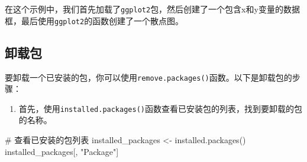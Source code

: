 \documentclass[
  letterpaper,
  DIV=11,
  numbers=noendperiod]{scrreprt}
\newenvironment{Shaded}{\begin{snugshade}}{\end{snugshade}}
\newcommand{\CommentTok}[1]{\textcolor[rgb]{0.37,0.37,0.37}{#1}}
\newcommand{\FunctionTok}[1]{\textcolor[rgb]{0.28,0.35,0.67}{#1}}
\newcommand{\NormalTok}[1]{\textcolor[rgb]{0.00,0.23,0.31}{#1}}
\newcommand{\OtherTok}[1]{\textcolor[rgb]{0.00,0.23,0.31}{#1}}
\newcommand{\StringTok}[1]{\textcolor[rgb]{0.13,0.47,0.30}{#1}}
\providecommand{\tightlist}{%
  \setlength{\itemsep}{0pt}\setlength{\parskip}{0pt}}\usepackage{longtable,booktabs,array}
\begin{document}
在这个示例中，我们首先加载了\texttt{ggplot2}包，然后创建了一个包含x和y变量的数据框，最后使用\texttt{ggplot2}的函数创建了一个散点图。

\hypertarget{ux5378ux8f7dux5305}{%
\subsection{卸载包}\label{ux5378ux8f7dux5305}}

要卸载一个已安装的包，你可以使用\texttt{remove.packages()}函数。以下是卸载包的步骤：

\begin{enumerate}
\def\labelenumi{\arabic{enumi}.}
\tightlist
\item
  首先，使用\texttt{installed.packages()}函数查看已安装包的列表，找到要卸载的包的名称。
\end{enumerate}

\begin{Shaded}
\begin{Highlighting}[]
\CommentTok{\# 查看已安装的包列表}
\NormalTok{installed\_packages }\OtherTok{\textless{}{-}} \FunctionTok{installed.packages}\NormalTok{()}
\NormalTok{installed\_packages[, }\StringTok{"Package"}\NormalTok{]}
\end{Highlighting}
\end{Shaded}
\end{document}
